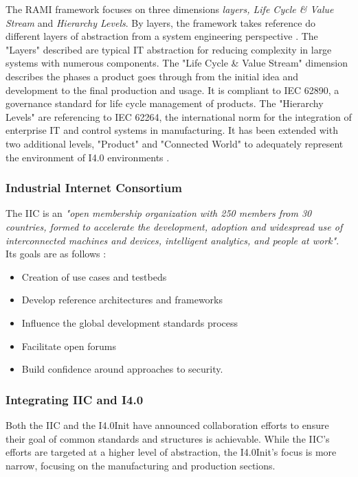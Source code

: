 The \ac{RAMI} framework focuses on three dimensions \emph{layers, Life Cycle \& Value Stream} and \emph{Hierarchy Levels}. By layers, the framework takes reference do different layers of abstraction from a system engineering perspective \cite{Hankel:2015}. 
The "Layers" described are typical IT abstraction for reducing complexity in large systems with numerous components. 
The "Life Cycle \& Value Stream" dimension describes the phases a product goes through from the initial idea and development to the final production and usage. It is compliant to IEC 62890, a governance standard for life cycle management of products.
The "Hierarchy Levels" are referencing to IEC 62264, the international norm for the integration of enterprise IT and control systems in manufacturing. It has been extended with two additional levels, "Product" and "Connected World" to adequately represent the environment of \ac{I4.0} environments \cite{Hankel:2015}.


\subsubsection{Industrial Internet Consortium}
The IIC is an \emph{"open membership organization with 250 members from 30 countries, formed to accelerate the development, adoption and widespread use of interconnected machines and devices, intelligent analytics, and people at work"}\cite{iic-progress:2016}. Its goals are as follows \cite{iic-aboutus:2016}:

\begin{itemize}
	\item  Creation of use cases and testbeds
\item  Develop reference architectures and frameworks
\item  Influence the global development standards process
\item  Facilitate open forums
\item  Build confidence around approaches to security.
\end{itemize}


\subsubsection{Integrating IIC and I4.0}

Both the \ac{IIC} and the \ac{I4.0Init} have announced collaboration efforts to ensure their goal of common standards and structures is achievable. While the IIC's efforts are targeted at a higher level of abstraction, the \ac{I4.0Init}'s focus is more narrow, focusing on the manufacturing and production sections. 


